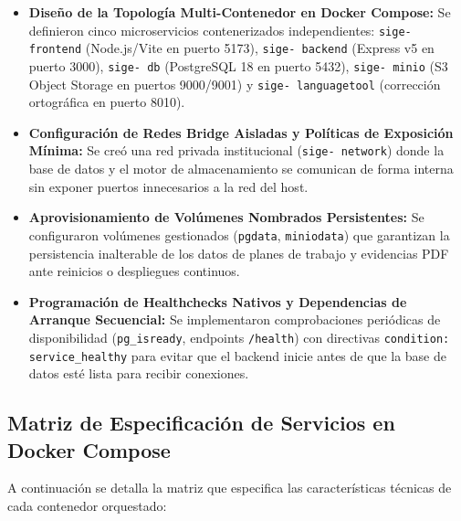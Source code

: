\documentclass[12pt,a4paper]{article}
\begin{document}
\begin{itemize}[leftmargin=1.5em, itemsep=4pt]
    \item \textbf{Diseño de la Topología Multi-Contenedor en Docker Compose:} Se definieron cinco microservicios contenerizados independientes: \texttt{sige- frontend} (Node.js/Vite en puerto 5173), \texttt{sige- backend} (Express v5 en puerto 3000), \texttt{sige- db} (PostgreSQL 18 en puerto 5432), \texttt{sige- minio} (S3 Object Storage en puertos 9000/9001) y \texttt{sige- languagetool} (corrección ortográfica en puerto 8010).
    \item \textbf{Configuración de Redes Bridge Aisladas y Políticas de Exposición Mínima:} Se creó una red privada institucional (\texttt{sige- network}) donde la base de datos y el motor de almacenamiento se comunican de forma interna sin exponer puertos innecesarios a la red del host.
    \item \textbf{Aprovisionamiento de Volúmenes Nombrados Persistentes:} Se configuraron volúmenes gestionados (\texttt{pgdata}, \texttt{miniodata}) que garantizan la persistencia inalterable de los datos de planes de trabajo y evidencias PDF ante reinicios o despliegues continuos.
    \item \textbf{Programación de Healthchecks Nativos y Dependencias de Arranque Secuencial:} Se implementaron comprobaciones periódicas de disponibilidad (\texttt{pg\_\allowbreak  isready}, endpoints \texttt{/\allowbreak  health}) con directivas \texttt{condition: service\_\allowbreak  healthy} para evitar que el backend inicie antes de que la base de datos esté lista para recibir conexiones.
\end{itemize}

\subsection{Matriz de Especificación de Servicios en Docker Compose}
A continuación se detalla la matriz que especifica las características técnicas de cada contenedor orquestado:
\end{document}
